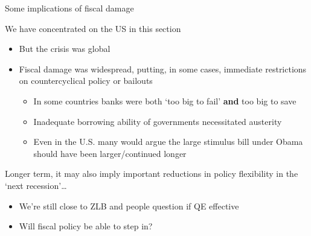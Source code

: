 

\begin{frame}{Some implications of fiscal damage}

We have concentrated on the US in this section
\begin{itemize}
\item	But the crisis was global
\item	Fiscal damage was widespread, putting, in some cases, immediate restrictions on countercyclical policy or bailouts
	\begin{itemize}
	\item	In some countries banks were both `too big to fail' \textbf{and} too big to save
	\item	Inadequate borrowing ability of governments necessitated austerity
	\item	Even in the U.S. many would argue the large stimulus bill under Obama should have been larger/continued longer
	\end{itemize}
\end{itemize}
\vspace{2mm}
Longer term, it may also imply important reductions in policy flexibility in the `next recession'\ldots
\begin{itemize}
\item	We're still close to ZLB and people question if QE effective
\item	Will fiscal policy be able to step in?
\end{itemize}

\end{frame}



